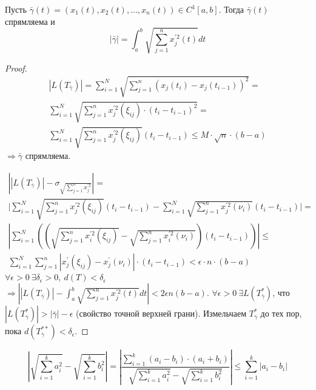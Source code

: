 \begin{theorem}
    Пусть $\bar{\gamma}(t) = (x_1(t), x_2(t), \dots, x_n(t)) \in C^1[a,b]$. Тогда $\bar{\gamma}(t)$ спрямляема и $$|\bar{\gamma}| = \int_{a}^{b} \sqrt{\sum_{j = 1}^{n} x_j^{'2}(t)} dt$$
\end{theorem}
\begin{proof}
    \begin{multline*}
        |L(T_{\bar{\gamma}})| = \sum_{i = 1}^{N} \sqrt{ \sum_{j = 1}^{n}(x_j(t_i) - x_j(t_{i - 1}))^2} =\\ \sum_{i = 1}^{N} \sqrt{\sum_{j = 1}^{n} x_j^{'2}(\xi_{ij}) \cdot (t_i - t_{i - 1})^2} =\\ \sum_{i = 1}^{N} \sqrt{\sum_{j = 1}^{n} x_j^{'2} (\xi_{ij})} (t_i - t_{i - 1}) \leqslant M \cdot \sqrt{n} \cdot (b - a)
    \end{multline*}
    $\Longrightarrow \bar{\gamma}$ спрямляема.
    
    \begin{multline*}
        \left| |L(T_{\bar{\gamma}})| - \sigma_{\sqrt{\sum_{j = 1}^{n} x_j^{'2}}} \right| =\\
        \Bigg| \sum_{i = 1}^{N} \sqrt{\sum_{j = 1}^{n} x_j^{'2} (\xi_{ij})}(t_i - t_{i - 1}) - \sum_{i = 1}^{N} \sqrt{\sum_{j = 1}^{n} x_j^{'2} (\nu_{i})}(t_i - t_{i - 1}) \Bigg| =\\ 
        \left| \sum_{i=1}^{N} \left( \left( \sqrt{\sum_{j = 1}^{n} x_i^{'2} (\xi_{ij})} - \sqrt{\sum_{j = 1}^{n} x_i^{'2} (\nu_{i})}  \right) (t_i - t_{i - 1}) \right) \right| \leqslant\\
        \sum_{i = 1}^{N} \sum_{j = 1}^{n} |x_j^{'} (\xi_{ij}) - x_j^{'} (\nu_i)| \cdot (t_i - t_{i - 1}) < \epsilon \cdot n \cdot (b - a)
    \end{multline*}
    $\forall \epsilon > 0 \ \exists \delta_{\epsilon} > 0,\ d(T) < \delta_{\epsilon}$
    $\Longrightarrow \left| |L(T_{\bar{\gamma}})| - \int_{a}^{b} \sqrt{\sum_{j = 1}^{n} x_{j}^{'2}(t)} dt \right| < 2 \epsilon n (b-a)$.
    $\forall \epsilon > 0 \ \exists L(T^{*}_{\bar{\gamma}})$, что $|L(T^{*}_{\bar{\gamma}}) | > |\bar{\gamma}| - \epsilon$ (свойство точной верхней грани). \newline
    Измельчаем $T_{\bar{\gamma}}^{*}$ до тех пор, пока $d(T_{\bar{\gamma}}^{**}) < \delta_{\epsilon}$.
\end{proof}

\begin{statement}
        \[\left|
            \sqrt{\sum_{i = 1}^{k} a_i^2} - \sqrt{\sum_{i = 1}^{k} b_i^2}
        \right| = 
        \left|
            \frac{\sum_{i = 1}^{k} (a_i - b_i) \cdot (a_i + b_i)}{\sqrt{\sum_{i = 1}^{k} a_i^2} - \sqrt{\sum_{i = 1}^{k} b_i^2}}
        \right| \leqslant \sum_{i = 1}^{k} |a_i - b_i|\]
\end{statement}